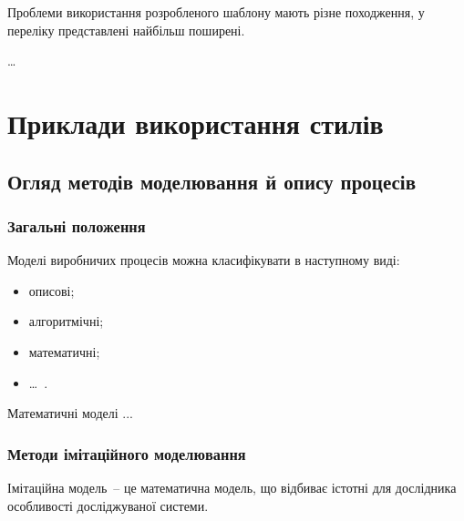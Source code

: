 Проблеми використання розробленого шаблону мають різне походження, у переліку представлені найбільш поширені.

\begin{longEnumerate}
\item \ldots 
\end{longEnumerate}

\section{Приклади використання стилів}

\subsection{Огляд методів моделювання й опису процесів}
\subsubsection{Загальні положення}
Моделі виробничих процесів можна класифікувати в наступному виді:
\begin{itemize}
\item описові;
\item алгоритмічні;
\item математичні;
\item \dots~.
\end{itemize}

Математичні моделі ...

\subsubsection{Методи імітаційного моделювання}
Імітаційна модель~-- це математична модель, що відбиває істотні для дослідника особливості досліджуваної системи.

